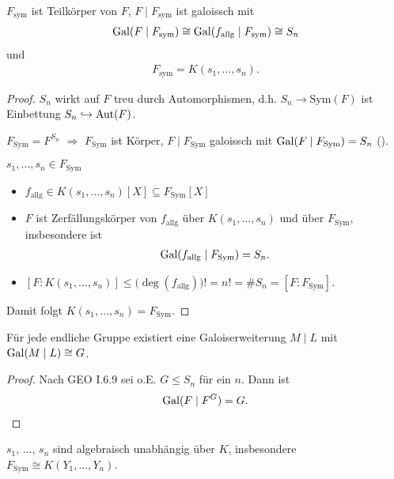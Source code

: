 \begin{proposition}
	$F_{\mathrm{sym}}$ ist Teilkörper von $F$, $F\mid F_{\mathrm{sym}}$ ist galoissch mit \begin{align*}
		\operatorname{Gal}(F\mid F_{\mathrm{sym}}) \cong \operatorname{Gal}(f_{\mathrm{allg}}\mid F_{\mathrm{sym}}) \cong S_n
	\end{align*}
	und
	\begin{align*}
		F_{\mathrm{sym}} = K(s_1,\dots,s_n).
	\end{align*}
\end{proposition}

\begin{proof}
	$S_n$ wirkt auf $F$ treu durch Automorphismen, d.h. $S_n\to \mathrm{Sym}(F)$ ist Einbettung $S_n \hookrightarrow \operatorname{Aut}(F)$.
	
	$F_{\mathrm{Sym}} = F^{S_n}$ $\Rightarrow$ $F_{\mathrm{Sym}}$ ist Körper, $F\mid F_{\mathrm{Sym}}$ galoissch mit $\operatorname{Gal}(F\mid F_{\mathrm{Sym}}) = S_n$ ().
	
	$s_1,\dots, s_n\in F_{\mathrm{Sym}}$
	\begin{itemize}[topsep=-6pt,label={$\Rightarrow$}]
		\item $f_{\mathrm{allg}} \in K(s_1,\dots,s_n)[X]\subseteq F_{\mathrm{Sym}}[X]$
		\item $F$ ist Zerfällungskörper von $f_{\mathrm{allg}}$ über $K(s_1,\dots,s_n)$ und über $F_{\mathrm{Sym}}$, insbesondere ist \begin{align*}
			\operatorname{Gal}(f_{\mathrm{allg}}\mid F_{\mathrm{Sym}}) = S_n.
		\end{align*}
		\item $[F:K(s_1,\dots,s_n)] \le \big(\deg(f_{\mathrm{allg}})\big)! = n! = \#S_n = [F:F_{\mathrm{Sym}}]$.
	\end{itemize}
	Damit folgt $K(s_1,\dots,s_n) = F_{\mathrm{Sym}}$.
\end{proof}

\begin{conclusion}
	Für jede endliche Gruppe existiert eine Galoiserweiterung $M\mid L$ mit $\operatorname{Gal}(M\mid L) \cong G$.
\end{conclusion}

\begin{proof}
	Nach GEO I.6.9 sei o.E. $G\le S_n$ für ein $n$. Dann ist \begin{align*}
		\operatorname{Gal}(F\mid F^G) = G.
	\end{align*}
\end{proof}

\begin{conclusion}
	$s_1$, $\dots$, $s_n$ sind algebraisch unabhängig über $K$, insbesondere $F_{\mathrm{Sym}}\cong K(Y_1,\dots,Y_n)$.
\end{conclusion}

